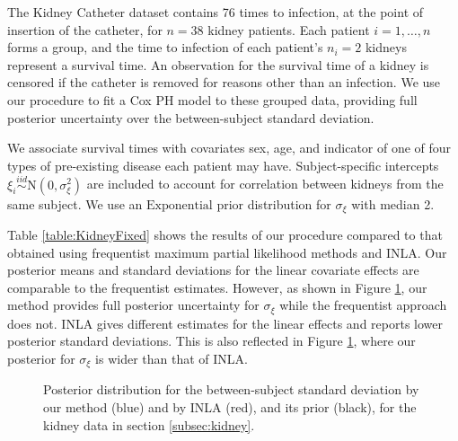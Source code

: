 \documentclass[serif,10pt]{wiley-article}
\begin{document}
The Kidney Catheter dataset contains 76 times to infection, at the point of insertion of the catheter, for $n = 38$  kidney patients. Each patient $i=1,\ldots,n$ forms a group, and the time to infection of each patient's $n_{i} = 2$ kidneys represent a survival time. An observation for the survival time of a kidney is censored if the catheter is removed for reasons other than an infection. We use our procedure to fit a Cox PH model to these grouped data, providing full posterior uncertainty over the between-subject standard deviation.

We associate survival times with covariates sex, age, and indicator of one of four types of pre-existing disease each patient may have. Subject-specific intercepts $\xi_{i}\overset{iid}{\sim}\text{N}(0,\sigma^{2}_{\xi})$ are included to account for correlation between kidneys from the same subject. We use an $\text{Exponential}$ prior distribution for $\sigma_{\xi}$ with median 2.

Table \ref{table:KidneyFixed} shows the results of our procedure compared to that obtained using frequentist maximum partial likelihood methods and INLA. Our posterior means and standard deviations for the linear covariate effects are comparable to the frequentist estimates. However, as shown in Figure \ref{fig:BetweenSubjectSD}, our method provides full posterior uncertainty for $\sigma_{\xi}$ while the frequentist approach does not. INLA gives different estimates for the linear effects and reports lower posterior standard deviations. This is also reflected in Figure \ref{fig:BetweenSubjectSD}, where our posterior for $\sigma_{\xi}$ is wider than that of INLA.

\begin{figure}[ht]
\centering
{}
\caption{Posterior distribution for the between-subject standard deviation by our method (blue) and by INLA (red), and its prior (black), for the kidney data in section \ref{subsec:kidney}.}
\label{fig:BetweenSubjectSD}
\end{figure}
\end{document}
